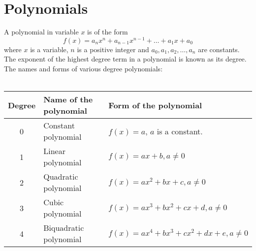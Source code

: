 \chapter{Polynomials}

\begin{outline}
    \1 A polynomial in variable $x$ is of the form $$f(x) = a_nx^n + a_{n - 1}x^{n - 1} + \dots + a_1x + a_0$$where $x$ is a variable, $n$ is a positive integer and $a_0, a_1, a_2,\dots,a_n$ are constants.
    \1 The exponent of the highest degree term in a polynomial is known as its degree.
    \1 The names and forms of various degree polynomials:\\\\
    \begin{tabular}{|c|l|l|}
        \hline
        Degree & Name of the polynomial & Form of the polynomial \\
        \hline
        0 & Constant polynomial & $f(x) = a$, $a$ is a constant. \\
        1 & Linear polynomial & $f(x) = ax + b, a \ne 0$ \\
        2 & Quadratic polynomial & $f(x) = ax^2 + bx + c, a \ne 0$ \\
        3 & Cubic polynomial & $f(x) = ax^3 + bx^2 + cx + d, a \ne 0$ \\
        4 & Biquadratic polynomial & $f(x) = ax^4 + bx^3 + cx^2 + dx + e, a \ne 0$ \\
        \hline
    \end{tabular}
\end{outline}
